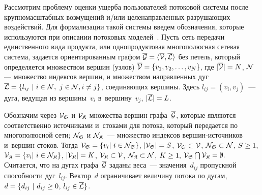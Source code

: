 \begin{multicols}{2}
Рассмотрим проблему оценки ущерба пользователей потоковой системы 
после крупномасштабных возмущений и/или целенаправленных разрушающих воздействий.
Для формализации такой системы введем обозначения, которые используются 
при описании потоковых  моделей~\cite{ford}.
Пусть сеть передачи единственного вида продукта, или 
однопродуктовая многополюсная сетевая система,   
задается ориентированным графом $\overline {\cal G} \hm= \langle \overline{\cal V}, \overline{\cal L} \rangle$ 
без петель, который определяется множеством вершин (узлов) 
$\overline{\cal V} \hm= \{v_1,v_2,\ldots ,v_ N\}$, где $|\overline{\cal V}| \hm= N$, ${\cal N}$ --- 
множество индексов вершин,
и множеством направленных дуг
$\overline {\cal L} \hm=\{l_{ij} \ | \ i \hm\in {\cal N}, \ j \hm\in {\cal N}, i \hm\not= j \}$,
соединяющих вершины. Здесь
$l_{ij} = (v_i, v_j)$~---  дуга, ведущая из вершины~$v_i$ в~вершину~$v_j$,  
$|\overline{\cal L}| \hm= L$.

Обозначим через ${\cal V}_{\frak S}$ и ${\cal V}_{\frak K}$  
множества вершин графа~$\overline {\cal G}$, 
которые являются соответственно источниками и~стоками для потока, который 
передается по многополюсной  сети;
${\cal N}_{\frak S}$ и $\cal{N}_{\frak K}$~---  множество индексов вер\-шин-ис\-точ\-ни\-ков 
и~вер\-шин-сто\-ков. 
Тогда
${\cal V}_\SS\hm = \{v_i | \ i \hm\in {\cal N}_\SS \}$,  $ |{\cal V}_\SS| \hm= S$,
${\cal V}_{\frak S} \subset \cal{V}$,  ${\cal N}_\SS \hm\subset {\cal N}$,  $S \hm\ge 1,$
${\cal V}_\SK = \{v_i | \ i \hm\in {\cal N}_\SK\}$,   
$|{\cal V}_\SK | \hm= K$, ${\cal V}_\SK \hm\subset {\cal V}$,  
${\cal N}_\SK \hm\subset {\cal N}$, $K \hm\ge 1,$
${\cal V}_\SS \bigcap {\cal V}_\SK \hm= \emptyset. $
Считается, что на дугах графа~$\overline {\cal G}$ заданы веса~--- значения~$d_{ij}$ 
пропускной способности дуг~$l_{ij}$. Вектор~$d$ 
ограничивает величину потока  по дугам,
$d = \{d_{ij} \ |\  d_{ij} \hm\geq 0$, $l_{ij}\hm\in \overline{\cal L}\}$.


\end{multicols}
